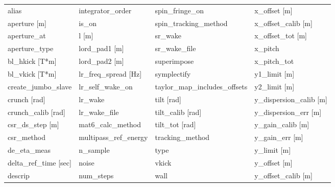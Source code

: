  \begin{tabular}{llll} \toprule
alias                            & integrator_order                 & spin_fringe_on                   & x_offset [m]                     \\
aperture [m]                     & is_on                            & spin_tracking_method             & x_offset_calib [m]               \\
aperture_at                      & l [m]                            & sr_wake                          & x_offset_tot [m]                 \\
aperture_type                    & lord_pad1 [m]                    & sr_wake_file                     & x_pitch                          \\
bl_hkick [T*m]                   & lord_pad2 [m]                    & superimpose                      & x_pitch_tot                      \\
bl_vkick [T*m]                   & lr_freq_spread [Hz]              & symplectify                      & y1_limit [m]                     \\
create_jumbo_slave               & lr_self_wake_on                  & taylor_map_includes_offsets      & y2_limit [m]                     \\
crunch [rad]                     & lr_wake                          & tilt [rad]                       & y_dispersion_calib [m]           \\
crunch_calib [rad]               & lr_wake_file                     & tilt_calib [rad]                 & y_dispersion_err [m]             \\
csr_ds_step [m]                  & mat6_calc_method                 & tilt_tot [rad]                   & y_gain_calib [m]                 \\
csr_method                       & multipass_ref_energy             & tracking_method                  & y_gain_err [m]                   \\
de_eta_meas                      & n_sample                         & type                             & y_limit [m]                      \\
delta_ref_time [sec]             & noise                            & vkick                            & y_offset [m]                     \\
descrip                          & num_steps                        & wall                             & y_offset_calib [m]               \\

\end{tabular}
